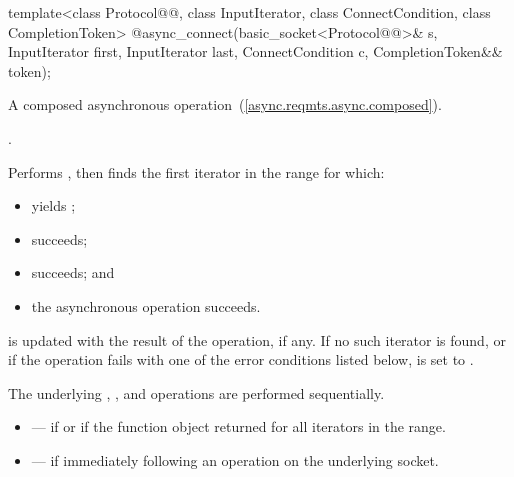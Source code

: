 \begin{itemdecl}
template<class Protocol@@, class InputIterator,
  class ConnectCondition, class CompletionToken>
    @\DEDUCED@ async_connect(basic_socket<Protocol@@>& s,
                          InputIterator first, InputIterator last,
                          ConnectCondition c,
                          CompletionToken&& token);
\end{itemdecl}

\begin{itemdescr}
\pnum
A composed asynchronous operation~(\ref{async.reqmts.async.composed}).

\pnum
\completionsig {}.

\pnum
\effects Performs , then finds the first iterator  in the range  for which:
\begin{itemize}
\item
{} yields ;
\item
{} succeeds;
\item
{} succeeds; and
\item
 the asynchronous operation  succeeds.
\end{itemize}
\pnum
{} is updated with the result of the  operation, if any. If no such iterator is found, or if the operation fails with one of the error conditions listed below,  is set to . \begin{note} The underlying , , and  operations are performed sequentially. \end{note}

\pnum
\errors
\begin{itemize}
\item
{} --- if  or if the function object  returned  for all iterators in the range.
\item
{} --- if  immediately following an  operation on the underlying socket.
\end{itemize}
\end{itemdescr}



